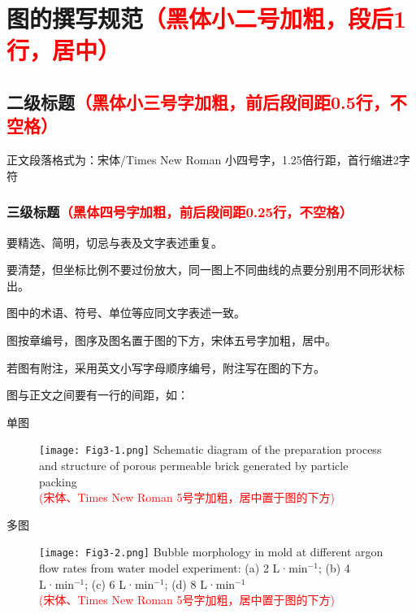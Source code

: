 \chapter[图的撰写规范]{图的撰写规范{\song\xiaosi \textcolor{red}{（黑体小二号加粗，段后1行，居中）}}}
\label{cha:command}


\section[二级标题]{二级标题{\song\xiaosi \textcolor{red}{（黑体小三号字加粗，前后段间距0.5行，不空格）}}}
正文段落格式为：宋体/Times New Roman 小四号字，1.25倍行距，首行缩进2字符

\subsection[三级标题]{三级标题{\song\xiaosi \textcolor{red}{（黑体四号字加粗，前后段间距0.25行，不空格）}}}
要精选、简明，切忌与表及文字表述重复。

要清楚，但坐标比例不要过份放大，同一图上不同曲线的点要分别用不同形状标出。

图中的术语、符号、单位等应同文字表述一致。

图按章编号，图序及图名置于图的下方，宋体五号字加粗，居中。

若图有附注，采用英文小写字母顺序编号，附注写在图的下方。 

图与正文之间要有一行的间距，如：

单图
\begin{figure}[!htbp]
    \centering
    \texttt{[image: Fig3-1.png]}
    {Schematic diagram of the preparation process and structure of porous permeable brick generated by particle packing\\
    \textcolor{red}{(宋体、Times New Roman 5号字加粗，居中置于图的下方)}}
    \label{Fig3-1}
\end{figure}
\clearpage
多图
\begin{figure}[!htbp]
    \centering
    \texttt{[image: Fig3-2.png]}
    {Bubble morphology in mold at different argon flow rates from water model experiment: (a) 2 L·min$^{-1}$; (b) 4 L·min$^{-1}$; (c) 6 L·min$^{-1}$; (d) 8 L·min$^{-1}$\\
    \textcolor{red}{(宋体、Times New Roman 5号字加粗，居中置于图的下方)}}
    \label{Fig3-1}
\end{figure}
\clearpage